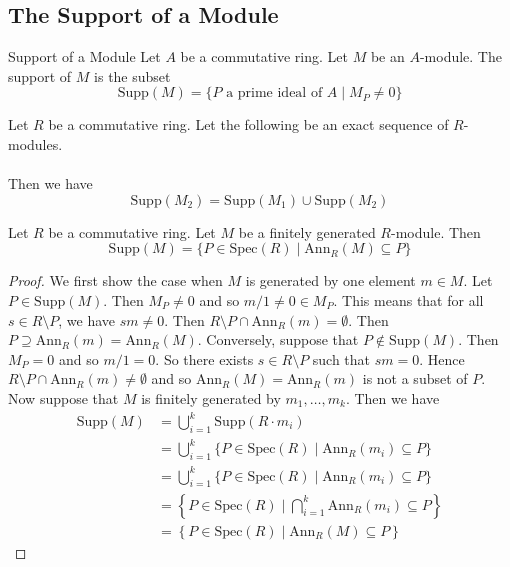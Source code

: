 \documentclass[a4paper]{article}
\begin{document}
\subsection{The Support of a Module}
\begin{defn}{Support of a Module}{} Let $A$ be a commutative ring. Let $M$ be an $A$-module. The support of $M$ is the subset $$\text{Supp}(M)=\{P\text{ a prime ideal of }A\;|\;M_P\neq 0\}$$
\end{defn}

\begin{lmm}{}{} Let $R$ be a commutative ring. Let the following be an exact sequence of $R$-modules. \\
\\
Then we have $$\text{Supp}(M_2)=\text{Supp}(M_1)\cup\text{Supp}(M_2)$$
\end{lmm}

\begin{prp}{}{} Let $R$ be a commutative ring. Let $M$ be a finitely generated $R$-module. Then $$\text{Supp}(M)=\{P\in\text{Spec}(R)\;|\;\text{Ann}_R(M)\subseteq P\}$$ 
\begin{proof}
We first show the case when $M$ is generated by one element $m\in M$. Let $P\in\text{Supp}(M)$. Then $M_P\neq 0$ and so $m/1\neq 0\in M_P$. This means that for all $s\in R\setminus P$, we have $sm\neq 0$. Then $R\setminus P\cap\text{Ann}_R(m)=\emptyset$. Then $P\supseteq\text{Ann}_R(m)=\text{Ann}_R(M)$. Conversely, suppose that $P\notin\text{Supp}(M)$. Then $M_P=0$ and so $m/1=0$. So there exists $s\in R\setminus P$ such that $sm=0$. Hence $R\setminus P\cap\text{Ann}_R(m)\neq\emptyset$ and so $\text{Ann}_R(M)=\text{Ann}_R(m)$ is not a subset of $P$. \\

Now suppose that $M$ is finitely generated by $m_1,\dots,m_k$. Then we have 
\begin{align*}
\text{Supp}(M)&=\bigcup_{i=1}^k\text{Supp}(R\cdot m_i)\\
&=\bigcup_{i=1}^k\{P\in\text{Spec}(R)\;|\;\text{Ann}_R(m_i)\subseteq P\}\\
&=\bigcup_{i=1}^k\{P\in\text{Spec}(R)\;|\;\text{Ann}_R(m_i)\subseteq P\}\\
&=\left\{P\in\text{Spec}(R)\;|\;\bigcap_{i=1}^k\text{Ann}_R(m_i)\subseteq P\right\}\tag{lmm1.1.2}\\
&=\left\{P\in\text{Spec}(R)\;|\;\text{Ann}_R(M)\subseteq P\right\}
\end{align*}
\end{proof}
\end{prp}
\end{document}
